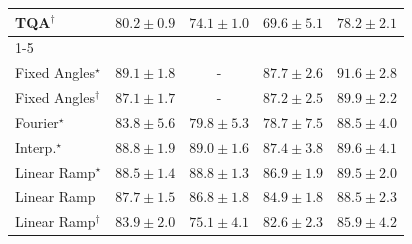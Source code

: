 \begin{tabular}{l|cccc|}
TQA$^\dagger$ & {\cellcolor[HTML]{197C40}} \color[HTML]{F1F1F1} $80.2\pm 0.9$ & {\cellcolor[HTML]{379E54}} \color[HTML]{F1F1F1} $74.1\pm 1.0$ & {\cellcolor[HTML]{55B567}} \color[HTML]{F1F1F1} $69.6\pm 5.1$ & {\cellcolor[HTML]{248644}} \color[HTML]{F1F1F1} $78.2\pm 2.1$ \\
\cline{1-5}
\multicolumn{5}{c}{\rule{0pt}{8pt}SV} \\
\midrule
Fixed Angles$^\star$ & {\cellcolor[HTML]{03456C}} \color[HTML]{F1F1F1} $89.1\pm 1.8$ & {\cellcolor[HTML]{000000}} \color[HTML]{F1F1F1} {\cellcolor{white}} \color{black} - & {\cellcolor[HTML]{034B76}} \color[HTML]{F1F1F1} $87.7\pm 2.6$ & {\cellcolor[HTML]{023858}} \color[HTML]{F1F1F1} $91.6\pm 2.8$ \\
Fixed Angles$^\dagger$ & {\cellcolor[HTML]{034E7B}} \color[HTML]{F1F1F1} $87.1\pm 1.7$ & {\cellcolor[HTML]{000000}} \color[HTML]{F1F1F1} {\cellcolor{white}} \color{black} - & {\cellcolor[HTML]{034E7B}} \color[HTML]{F1F1F1} $87.2\pm 2.5$ & {\cellcolor[HTML]{034165}} \color[HTML]{F1F1F1} $89.9\pm 2.2$ \\
Fourier$^\star$ & {\cellcolor[HTML]{045E93}} \color[HTML]{F1F1F1} $83.8\pm 5.6$ & {\cellcolor[HTML]{056BA9}} \color[HTML]{F1F1F1} $79.8\pm 5.3$ & {\cellcolor[HTML]{056FAE}} \color[HTML]{F1F1F1} $78.7\pm 7.5$ & {\cellcolor[HTML]{034871}} \color[HTML]{F1F1F1} $88.5\pm 4.0$ \\
Interp.$^\star$ & {\cellcolor[HTML]{03466E}} \color[HTML]{F1F1F1} $88.8\pm 1.9$ & {\cellcolor[HTML]{03456C}} \color[HTML]{F1F1F1} $89.0\pm 1.6$ & {\cellcolor[HTML]{034D79}} \color[HTML]{F1F1F1} $87.4\pm 3.8$ & {\cellcolor[HTML]{034267}} \color[HTML]{F1F1F1} $89.6\pm 4.1$ \\
Linear Ramp$^\star$ & {\cellcolor[HTML]{034871}} \color[HTML]{F1F1F1} $88.5\pm 1.4$ & {\cellcolor[HTML]{03466E}} \color[HTML]{F1F1F1} $88.8\pm 1.3$ & {\cellcolor[HTML]{034F7D}} \color[HTML]{F1F1F1} $86.9\pm 1.9$ & {\cellcolor[HTML]{034369}} \color[HTML]{F1F1F1} $89.5\pm 2.0$ \\
Linear Ramp & {\cellcolor[HTML]{034B76}} \color[HTML]{F1F1F1} $87.7\pm 1.5$ & {\cellcolor[HTML]{03517E}} \color[HTML]{F1F1F1} $86.8\pm 1.8$ & {\cellcolor[HTML]{045A8D}} \color[HTML]{F1F1F1} $84.9\pm 1.8$ & {\cellcolor[HTML]{034871}} \color[HTML]{F1F1F1} $88.5\pm 2.3$ \\
Linear Ramp$^\dagger$ & {\cellcolor[HTML]{045E93}} \color[HTML]{F1F1F1} $83.9\pm 2.0$ & {\cellcolor[HTML]{1E80B8}} \color[HTML]{F1F1F1} $75.1\pm 4.1$ & {\cellcolor[HTML]{046299}} \color[HTML]{F1F1F1} $82.6\pm 2.3$ & {\cellcolor[HTML]{045585}} \color[HTML]{F1F1F1} $85.9\pm 4.2$ \\

\end{tabular}
